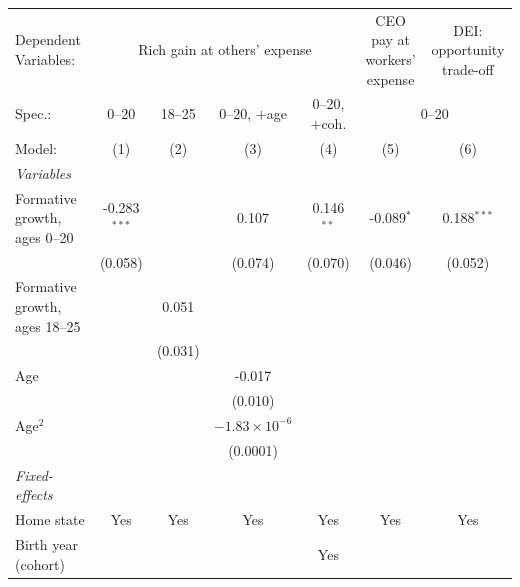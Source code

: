       \begin{adjustbox}{max width=\linewidth}
   \begin{tabular}{lcccccc}
      \tabularnewline \midrule \midrule
      Dependent Variables: & \multicolumn{4}{c}{Rich gain at others' expense} & \shortstack{CEO pay at\\ workers' expense} & \shortstack{DEI: opportunity\\ trade-off}\\
      Spec.: & 0--20 & 18--25 & 0--20, $+$age & 0--20, $+$coh. & \multicolumn{2}{c}{0--20} \\ 
      Model:                        & (1)            & (2)     & (3)                    & (4)          & (5)          & (6)\\  
      \midrule
      \emph{Variables}\\
      Formative growth, ages 0--20  & -0.283$^{***}$ &         & 0.107                  & 0.146$^{**}$ & -0.089$^{*}$ & 0.188$^{***}$\\   
                                    & (0.058)        &         & (0.074)                & (0.070)      & (0.046)      & (0.052)\\   
      Formative growth, ages 18--25 &                & 0.051   &                        &              &              &   \\   
                                    &                & (0.031) &                        &              &              &   \\   
      Age                           &                &         & -0.017                 &              &              &   \\   
                                    &                &         & (0.010)                &              &              &   \\   
      Age$^2$                       &                &         & $-1.83\times 10^{-6}$  &              &              &   \\   
                                    &                &         & (0.0001)               &              &              &   \\   
      \midrule
      \emph{Fixed-effects}\\
      Home state                    & Yes            & Yes     & Yes                    & Yes          & Yes          & Yes\\  
      Birth year (cohort)           &                &         &                        & Yes          &              & \\  

\end{tabular}
\end{adjustbox}
